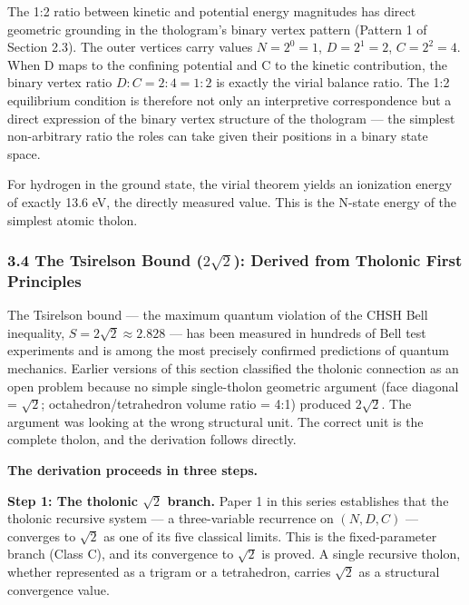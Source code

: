 \documentclass[12pt]{article}
\begin{document}
The 1:2 ratio between kinetic and potential energy magnitudes has direct
geometric grounding in the thologram's binary vertex pattern (Pattern 1
of Section 2.3). The outer vertices carry values \(N = 2^0 = 1\),
\(D = 2^1 = 2\), \(C = 2^2 = 4\). When D maps to the confining potential
and C to the kinetic contribution, the binary vertex ratio
\(D:C = 2:4 = 1:2\) is exactly the virial balance ratio. The 1:2
equilibrium condition is therefore not only an interpretive
correspondence but a direct expression of the binary vertex structure of
the thologram --- the simplest non-arbitrary ratio the roles can take
given their positions in a binary state space.

For hydrogen in the ground state, the virial theorem yields an
ionization energy of exactly 13.6 eV, the directly measured value. This
is the N-state energy of the simplest atomic tholon.

\subsubsection{\texorpdfstring{3.4 The Tsirelson Bound (\(2\sqrt{2}\)):
Derived from Tholonic First
Principles}{3.4 The Tsirelson Bound (2\textbackslash sqrt\{2\}): Derived from Tholonic First Principles}}\label{the-tsirelson-bound-2sqrt2-derived-from-tholonic-first-principles}

The Tsirelson bound --- the maximum quantum violation of the CHSH Bell
inequality, \(S = 2\sqrt{2} \approx 2.828\) --- has been measured in
hundreds of Bell test experiments and is among the most precisely
confirmed predictions of quantum mechanics. Earlier versions of this
section classified the tholonic connection as an open problem because no
simple single-tholon geometric argument (face diagonal = \(\sqrt{2}\);
octahedron/tetrahedron volume ratio = 4:1) produced \(2\sqrt{2}\). The
argument was looking at the wrong structural unit. The correct unit is
the complete tholon, and the derivation follows directly.

\textbf{The derivation proceeds in three steps.}

\textbf{Step 1: The tholonic \(\sqrt{2}\) branch.} Paper 1 in this
series establishes that the tholonic recursive system --- a
three-variable recurrence on \((N, D, C)\) --- converges to \(\sqrt{2}\)
as one of its five classical limits. This is the fixed-parameter branch
(Class C), and its convergence to \(\sqrt{2}\) is proved. A single
recursive tholon, whether represented as a trigram or a tetrahedron,
carries \(\sqrt{2}\) as a structural convergence value.
\end{document}
